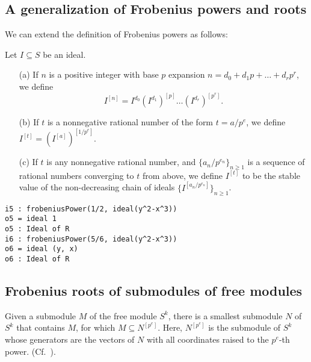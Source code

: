 \documentclass[11pt]{amsart}
\begin{document}
\subsection{A generalization of Frobenius powers and roots}
We can extend the definition of Frobenius powers as follows:
\begin{definition}
Let  $I\subseteq S$ be an ideal.
\begin{enumerate}
 \item[(a)] If $n$ is a positive integer with base $p$ expansion  $n=d_0 + d_1 p +  \dots + d_r p^r$, we define
\[ I^{[n]}=I^{d_0} \left(I^{d_1}\right)^{[p]} \dots  (I^{d_r})^{[p^r]}.\]
 \item[(b)] If $t$ is a nonnegative rational number of the form $t = a/p^e$, we define  $I^{[t]} = (I^{[a]})^{[1/p^e]}.$
 \item[(c)] If $t$ is any nonnegative rational number, and $\{a_n/p^{e_n}\}_{n\geq 1}$ is a sequence of rational numbers converging to $t$ from above, we define $I^{[t]}$
 to be the stable value of the non-decreasing chain of ideals $\{I^{[a_n/p^{e_n}]}\}_{n\geq 1}$.
\end{enumerate}
\end{definition}


\begin{verbatim}
i5 : frobeniusPower(1/2, ideal(y^2-x^3))
o5 = ideal 1
o5 : Ideal of R
i6 : frobeniusPower(5/6, ideal(y^2-x^3))
o6 = ideal (y, x)
o6 : Ideal of R
\end{verbatim}


\subsection{Frobenius  roots of submodules of free modules}

Given a submodule $M$ of the free module $S^k$, there is a smallest submodule $N$ of $S^k$ that contains $M$, for which $M\subseteq N^{[p^e]}$.
Here,  $N^{[p^e]}$ is the submodule  of $S^k$ whose generators are the vectors of $N$ with all coordinates raised to the $p^e$-th power. (Cf.~\cite{KatzmanZhangAlgorithm}).
\end{document}
